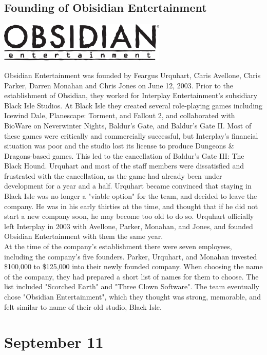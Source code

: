 \documentclass[11pt]{report}
\begin{document}
\subsection{Founding of Obisidian Entertainment}
\vspace{2mm}\begin{center}\includegraphics[width=8cm]{./img/obsidianLogo.jpg}\end{center}
Obsidian Entertainment was founded by Feargus Urquhart, Chris Avellone, Chris Parker, Darren Monahan and Chris Jones on June 12, 2003. Prior to the establishment of Obsidian, they worked for Interplay Entertainment's subsidiary Black Isle Studios. At Black Isle they created several role-playing games including Icewind Dale, Planescape: Torment, and Fallout 2, and collaborated with BioWare on Neverwinter Nights, Baldur's Gate, and Baldur's Gate II. Most of these games were critically and commercially successful, but Interplay's financial situation was poor and the studio lost its license to produce Dungeons \& Dragons-based games. This led to the cancellation of Baldur's Gate III: The Black Hound. Urquhart and most of the staff members were dissatisfied and frustrated with the cancellation, as the game had already been under development for a year and a half. Urquhart became convinced that staying in Black Isle was no longer a "viable option" for the team, and decided to leave the company. He was in his early thirties at the time, and thought that if he did not start a new company soon, he may become too old to do so. Urquhart officially left Interplay in 2003 with Avellone, Parker, Monahan, and Jones, and founded Obsidian Entertainment with them the same year.\\
\indent At the time of the company's establishment there were seven employees, including the company's five founders. Parker, Urquhart, and Monahan invested \$100,000 to \$125,000 into their newly founded company. When choosing the name of the company, they had prepared a short list of names for them to choose. The list included "Scorched Earth" and "Three Clown Software". The team eventually chose "Obsidian Entertainment", which they thought was strong, memorable, and felt similar to name of their old studio, Black Isle.
\section{September 11}
\end{document}
